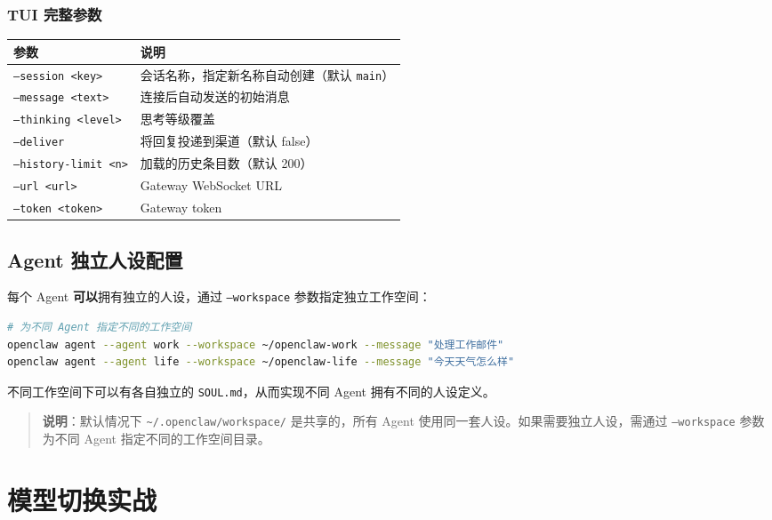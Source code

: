 \subsubsection{TUI 完整参数}


\begin{table}[h]
\centering
\small
\begin{tabular}{|l|p{}|}
\hline
参数 & 说明 \\
\hline
\texttt{--session <key>} & 会话名称，指定新名称自动创建（默认 \texttt{main}） \\
\hline
\texttt{--message <text>} & 连接后自动发送的初始消息 \\
\hline
\texttt{--thinking <level>} & 思考等级覆盖 \\
\hline
\texttt{--deliver} & 将回复投递到渠道（默认 false） \\
\hline
\texttt{--history-limit <n>} & 加载的历史条目数（默认 200） \\
\hline
\texttt{--url <url>} & Gateway WebSocket URL \\
\hline
\texttt{--token <token>} & Gateway token \\
\hline
\end{tabular}
\end{table}

\subsection{Agent 独立人设配置}


每个 Agent \textbf{可以}拥有独立的人设，通过 \texttt{--workspace} 参数指定独立工作空间：

\begin{lstlisting}[language=bash]
# 为不同 Agent 指定不同的工作空间
openclaw agent --agent work --workspace ~/openclaw-work --message "处理工作邮件"
openclaw agent --agent life --workspace ~/openclaw-life --message "今天天气怎么样"
\end{lstlisting}

不同工作空间下可以有各自独立的 \texttt{SOUL.md}，从而实现不同 Agent 拥有不同的人设定义。

\begin{quote}
\textbf{说明}：默认情况下 \texttt{\textasciitilde{}/.openclaw/workspace/} 是共享的，所有 Agent 使用同一套人设。如果需要独立人设，需通过 \texttt{--workspace} 参数为不同 Agent 指定不同的工作空间目录。
\end{quote}

\hrulefill

\section{模型切换实战}


